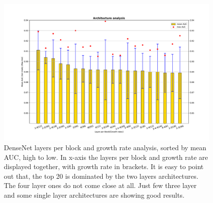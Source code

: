 
\begin{center}
 \begin{figure}[ht]
 \centering
 \includegraphics[width=16cm]{images/densenet/siamese/densenet_siamese_architecture_bar}
 \caption[DenseNet layers per block and growth rate mean AUC analysis]{DenseNet layers per block and growth rate analysis, sorted by mean AUC, high to low. In x-axis the layers per block and growth rate are displayed together, 
 with growth rate in brackets. It is easy to point out that, the top 20 is 
 dominated by the two layers architectures. The four layer ones do not come close at all. Just few three layer and some single layer architectures are showing good results.}
 \label{fig:meanAUC_growth_and_layers}
 \end{figure}
\end{center}

